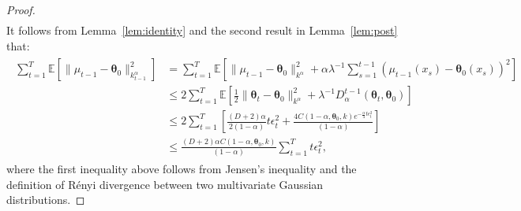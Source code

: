 \documentclass[final,12pt]{colt2026} %
\begin{document}
\begin{proof}
\begin{align}
        \label{eq:GB3}
    \end{align}
It follows from Lemma~\ref{lem:identity} and the second result in Lemma~\ref{lem:post} that:
\begin{align}\label{eq:GB4}
\begin{split}
    \sum_{t=1}^T  \mathbb{E} \left[\|\mu_{t-1}-\pmb \theta_0 \|_{k_{t-1}^{\alpha}}^2 \right] 
    &= \sum_{t=1}^T  \mathbb{E} \left[\|\mu_{t-1}-\pmb \theta_0\|_{k^\alpha}^2 +\alpha\lambda^{-1} \sum_{s=1}^{t-1}(\mu_{t-1}(x_s)-\pmb \theta_0(x_s))^2  \right]\\
    &\leq 2\sum_{t=1}^T  \mathbb{E} \left[\frac{1}{2} \|\pmb \theta_t -\pmb \theta_0\|_{k^\alpha}^2 +  \lambda^{-1} D_{\alpha}^{t-1}(\pmb \theta_t,\pmb \theta_0)  \right]\\
    &\leq 2 \sum_{t=1}^T  \left[\frac{(D+2)\alpha}{2(1-\alpha)} t\epsilon_t^2 + \frac{4C(1-\alpha,\pmb\theta_0,k) e^{ - \frac{\alpha}{4}  t\epsilon_t^2 } }{(1-\alpha)} \right]\\
    &\leq  \frac{(D+2)\alpha C(1-\alpha,\pmb\theta_0,k)}{ (1-\alpha)}  \sum_{t=1}^T  t\epsilon_t^2,
\end{split}
\end{align}
where the first inequality above follows from Jensen's inequality and the definition of R\'enyi divergence between two multivariate Gaussian distributions. %


\end{proof}
\end{document}
